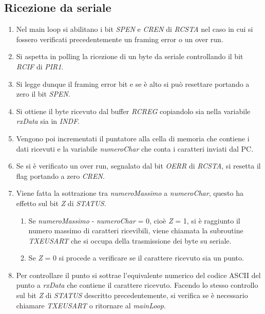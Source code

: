 \documentclass{article}
\begin{document}
	\subsection{Ricezione da seriale}
	\begin{enumerate}
		\item Nel main loop si abilitano i bit \emph{SPEN} e \emph{CREN} di \emph{RCSTA} nel caso in cui si fossero verificati precedentemente un framing error o un over run. 
		\item Si aspetta in polling la ricezione di un byte da seriale controllando il bit \emph{RCIF} di \emph{PIR1}. 
		\item Si legge dunque il framing error bit e se è alto si può resettare portando a zero il bit \emph{SPEN}. 
		\item Si ottiene il byte ricevuto dal buffer \emph{RCREG} copiandolo sia nella variabile \emph{rxData} sia in \emph{INDF}. 
		\item Vengono poi incrementati il puntatore alla cella di memoria che contiene i dati ricevuti e la variabile \emph{numeroChar} che conta i caratteri inviati dal PC. 
		\item Se si è verificato un over run, segnalato dal bit \emph{OERR} di \emph{RCSTA}, si resetta il flag portando a zero \emph{CREN}.
		\item Viene fatta la sottrazione tra \emph{numeroMassimo} a \emph{numeroChar}, questo ha effetto sul bit \emph{Z} di \emph{STATUS}.
		\begin {enumerate} 
			\item Se \emph{numeroMassimo} - \emph{numeroChar} = 0, cioè \emph{Z} = 1, si è raggiunto il numero massimo di caratteri ricevibili, viene chiamata la subroutine \emph{TXEUSART} che si occupa della trasmissione dei byte su seriale.
			\item Se  \emph{Z} = 0 si procede a verificare se il carattere ricevuto sia un punto. 
		\end{enumerate}
		\item Per controllare il punto si sottrae l'equivalente numerico del codice ASCII del punto a \emph{rxData} che contiene il carattere ricevuto. Facendo lo stesso controllo sul bit \emph{Z} di \emph{STATUS} descritto precedentemente, si verifica se è necessario chiamare \emph{TXEUSART} o ritornare al \emph{mainLoop}.
	\end{enumerate}
\end{document}

